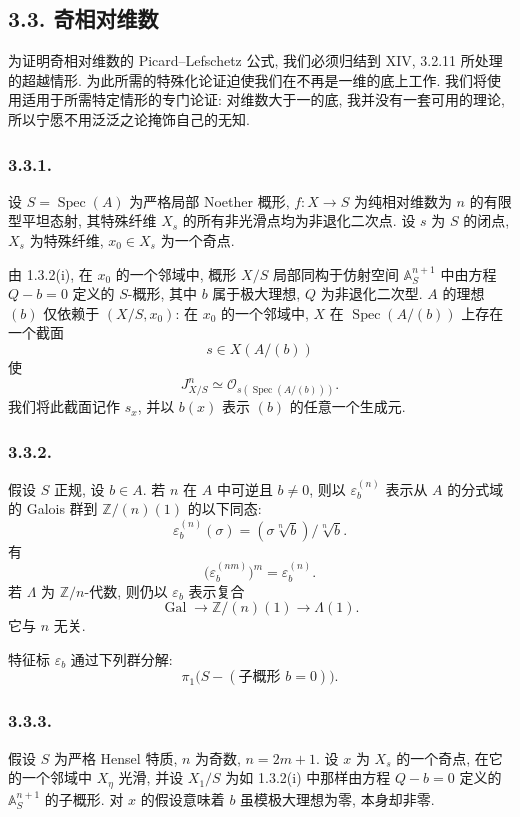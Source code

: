 \subsection*{3.3. 奇相对维数}

为证明奇相对维数的 Picard--Lefschetz 公式, 我们必须归结到 XIV, 3.2.11 所处理的超越情形. 为此所需的特殊化论证迫使我们在不再是一维的底上工作. 我们将使用适用于所需特定情形的专门论证: 对维数大于一的底, 我并没有一套可用的理论, 所以宁愿不用泛泛之论掩饰自己的无知.

\subsubsection*{3.3.1.}
设 $S=\operatorname{Spec}(A)$ 为严格局部 Noether 概形, $f:X\to S$ 为纯相对维数为 $n$ 的有限型平坦态射, 其特殊纤维 $X_s$ 的所有非光滑点均为非退化二次点. 设 $s$ 为 $S$ 的闭点, $X_s$ 为特殊纤维, $x_0\in X_s$ 为一个奇点.

由 1.3.2(i), 在 $x_0$ 的一个邻域中, 概形 $X/S$ 局部同构于仿射空间 $\mathbb A^{n+1}_S$ 中由方程 $Q-b=0$ 定义的 $S$-概形, 其中 $b$ 属于极大理想, $Q$ 为非退化二次型. $A$ 的理想 $(b)$ 仅依赖于 $(X/S,x_0)$: 在 $x_0$ 的一个邻域中, $X$ 在 $\operatorname{Spec}(A/(b))$ 上存在一个截面
\[
s\in X(A/(b))
\]
使
\[
J^n_{X/S}\simeq
\mathcal O_{s(\operatorname{Spec}(A/(b)))}.
\]
我们将此截面记作 $s_x$, 并以 $b(x)$ 表示 $(b)$ 的任意一个生成元.

\subsubsection*{3.3.2.}
假设 $S$ 正规, 设 $b\in A$. 若 $n$ 在 $A$ 中可逆且 $b\ne0$, 则以 $\varepsilon_b^{(n)}$ 表示从 $A$ 的分式域的 Galois 群到 $\mathbb Z/(n)(1)$ 的以下同态:
\[
\varepsilon_b^{(n)}(\sigma)
= (\sigma\sqrt[n]{b})/\sqrt[n]{b}.
\]
有
\[
\bigl(\varepsilon_b^{(nm)}\bigr)^m=\varepsilon_b^{(n)}.
\]
若 $\Lambda$ 为 $\mathbb Z/n$-代数, 则仍以 $\varepsilon_b$ 表示复合
\[
\operatorname{Gal}\longrightarrow\mathbb Z/(n)(1)
\longrightarrow\Lambda(1).
\]
它与 $n$ 无关.

特征标 $\varepsilon_b$ 通过下列群分解:
\[
\pi_1\bigl(S-(\text{子概形 }b=0)\bigr).
\]

\subsubsection*{3.3.3.}
假设 $S$ 为严格 Hensel 特质, $n$ 为奇数, $n=2m+1$. 设 $x$ 为 $X_s$ 的一个奇点, 在它的一个邻域中 $X_\eta$ 光滑, 并设 $X_1/S$ 为如 1.3.2(i) 中那样由方程 $Q-b=0$ 定义的 $\mathbb A^{n+1}_S$ 的子概形. 对 $x$ 的假设意味着 $b$ 虽模极大理想为零, 本身却非零.

